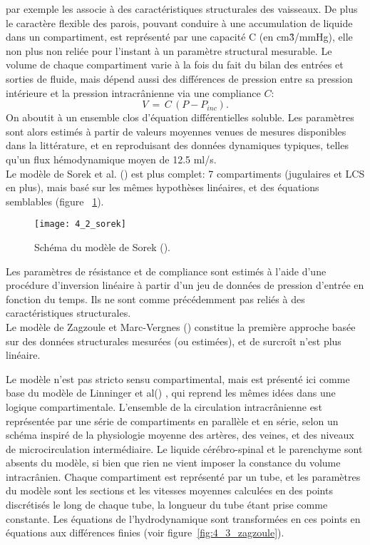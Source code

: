 par exemple les associe à des caractéristiques structurales des vaisseaux. De plus le caractère flexible
des parois, pouvant conduire à une accumulation de liquide dans un compartiment, est représenté par
une capacité C (en cm\^3/mmHg), elle non plus non reliée pour l'instant à un paramètre structural mesurable. Le volume
de chaque compartiment varie à la fois du fait du bilan des entrées et sorties de fluide, mais dépend
aussi des différences de pression entre sa pression intérieure et la pression intracrânienne via une compliance $C$:
\begin{equation}
V\,=\,C\,(P-P_{inc }).
\end{equation}
On aboutit à un ensemble clos d'équation différentielles soluble. Les paramètres sont alors estimés à
partir de valeurs moyennes venues de mesures disponibles dans la littérature, et en reproduisant des
données dynamiques typiques, telles qu'un flux hémodynamique moyen de 12.5 ml/s.\\
Le modèle de Sorek et al. (\cite{Sorek1988}) est plus complet: 7 compartiments (jugulaires et LCS en plus),
mais basé sur les mêmes hypothèses linéaires, et des équations semblables (figure ~\ref{fig:4_2_sorek}). 
\begin{figure}[!t]
\centering
\texttt{[image: 4\_2\_sorek]}
\caption{Schéma du modèle de Sorek (\cite{Sorek1988}).}
\label{fig:4_2_sorek}	
\end{figure}
Les paramètres de
résistance et de compliance sont estimés à l'aide d'une procédure d'inversion linéaire à partir d'un jeu
de données de pression d'entrée en fonction du temps. Ils ne sont comme précédemment pas reliés à
des caractéristiques structurales.\\
Le modèle de Zagzoule et Marc-Vergnes (\cite{Zagzoule1986}) constitue la première approche basée sur des
données structurales mesurées (ou estimées), et de surcroît n'est plus linéaire. 

Le modèle n'est pas
stricto sensu compartimental, mais est présenté ici comme base du modèle de Linninger et al(\cite{Linninger2009}) , qui
reprend les mêmes idées dans une logique compartimentale. L'ensemble de la circulation
intracrânienne est représentée par une série de compartiments en parallèle et en série, selon un
schéma inspiré de la physiologie moyenne des artères, des veines, et des niveaux de microcirculation
intermédiaire. Le liquide cérébro-spinal et le parenchyme sont absents du modèle, si bien que rien ne
vient imposer la constance du volume intracrânien. Chaque compartiment est représenté par un tube,
et les paramètres du modèle sont les sections et les vitesses moyennes calculées en des points
discrétisés le long de chaque tube, la longueur du tube étant prise comme constante. Les équations de l'hydrodynamique sont transformées en ces points en équations aux différences finies (voir figure~\ref{fig:4_3_zagzoule}). 

